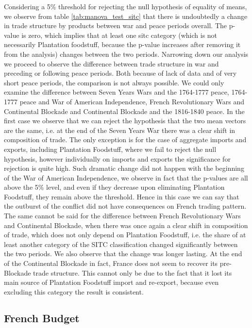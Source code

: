 \documentclass[12pt,a4paper,notitlepage,english]{article}
\begin{document}
\begin{appendix}
Considering a 5\% threshold for rejecting the null hypothesis of equality of means, we observe from table \ref{tab:manova_test_sitc} that there is undoubtedly a change in trade structure by products between war and peace periods overall. The p-value is zero, which implies that at least one sitc category (which is not necessarily Plantation foodstuff, because the p-value increases after removing it from the analysis) changes between the two periods. Narrowing down our analysis we proceed to observe the difference between trade structure in war and preceding or following peace periods. Both because of lack of data and of very short peace periods, the comparison is not always possible. We could only examine the difference between Seven Years Wars and the 1764-1777 peace, 1764-1777 peace and War of American Independence, French Revolutionary Wars and Continental Blockade and Continental Blockade and the 1816-1840 peace. In the first case we observe that we can reject the hypothesis that the two mean vectors are the same, i.e. at the end of the Seven Years War there was a clear shift in composition of trade. The only exception is for the case of aggregate imports and exports, including Plantation Foodstuff, where we fail to reject the null hypothesis, however individually on imports and exports the significance for rejection is quite high. Such dramatic change did not happen with the beginning of the War of American Independence, we observe in fact that the p-values are all above the 5\% level, and even if they decrease upon eliminating Plantation Foodstuff, they remain above the threshold. Hence in this case we can say that the outburst of the conflict did not have consequences on French trading pattern. The same cannot be said for the difference between French Revolutionary Wars and Continental Blockade, when there was once again a clear shift in composition of trade, which does not only depend on Plantation Foodstuff, i.e. the share of at least another category of the SITC classification changed significantly between the two periods. We also observe that the change was longer lasting. At the end of the Continental Blockade in fact, France does not seem to recover its pre-Blockade trade structure. This cannot only be due to the fact that it lost its main source of Plantation Foodstuff import and re-export, because even excluding this category the result is consistent. 

\subsection{French Budget} \label{french_budget}


\end{appendix}
\end{document}
